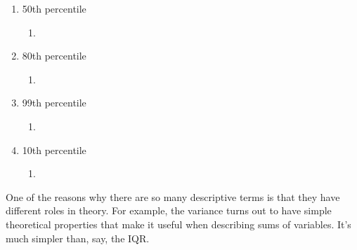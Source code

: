 \begin{enumerate}
\item 50th percentile
\begin{enumerate}
\item {}
\end{enumerate}

\item 80th percentile
\begin{enumerate}
\item {}
\end{enumerate}

\item 99th percentile
\begin{enumerate}
\item {}
\end{enumerate}

\item 10th percentile
\begin{enumerate}
\item {}
\end{enumerate}

\end{enumerate}

One of the reasons why there are so many descriptive terms is that
they have different roles in theory.  For example, the variance turns
out to have simple theoretical properties that make it useful when
describing sums of variables.  It's much simpler than, say, the IQR.


